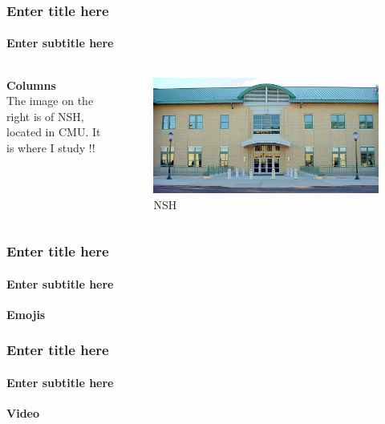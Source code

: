 \documentclass[11pt]{beamer}
\begin{document}
\begin{frame}
\frametitle{Enter title here}
\framesubtitle{Enter subtitle here}

\begin{columns}[c] %
\textbf{Columns} \\
The image on the right is of NSH, located in CMU. It is where I study !!
\begin{figure}[htp]
\centering
\includegraphics[scale=.1]{images/nsh.jpg}
\caption{NSH}
\label{}
\end{figure}
\end{columns}

\end{frame}

\begin{frame}
\frametitle{Enter title here}
\framesubtitle{Enter subtitle here}

\textbf{Emojis} \\

\dSmiley[5] 
\dSadey[5]
\dLaughey[5]
\dAnnoey[5]
\dNeutrey[5]
\dWinkey[5]
\olddWinkey[5]
\dSey[5]
\dXey[5]
\dInnocey[5]
\dCooley[5]
\dTongey[5]
\dNursey[5]
\dVomey[5]
\dWalley[5]
\drWalley[5]
\dNinja[5]



\end{frame}

\begin{frame}
\frametitle{Enter title here}
\framesubtitle{Enter subtitle here}

\textbf{Video} \\
\end{frame}
\end{document}
